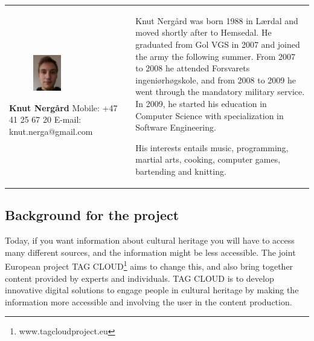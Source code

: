 \documentclass[11pt]{book}
\begin{document}
\begin{table}[H]
\centering
\begin{tabular}{ p{7cm} p{7cm} }
\parbox{7cm}{
\begin{figure}[H]
      \includegraphics[width=0.4\textwidth]{Figures/knut.jpg}
      \label{fig:partners_group_knut}
\end{figure}
\textbf{Knut Nergård}\\
Mobile: +47 41 25 67 20\\
E-mail: knut.nerga@gmail.com} & \parbox{7cm}{
Knut Nergård was born 1988 in Lærdal and moved shortly after to Hemsedal. He graduated from Gol VGS in 2007 and joined the army the following summer. From 2007 to 2008 he attended Forsvarets ingeniørhøgskole, and from 2008 to 2009 he went through the mandatory military service. In 2009, he started his education in Computer Science with specialization in Software Engineering. 

His interests entails music, programming, martial arts, cooking, computer games, bartending and knitting.
}
\end{tabular}
\label{tab:partners_group_knut}
\end{table}


\subsection{Background for the project}
Today, if you want information about cultural heritage you will have to access many different sources, and the information might be less accessible. The joint European project TAG CLOUD\footnote{www.tagcloudproject.eu} aims to change this, and also bring together content provided by experts and individuals. TAG CLOUD is to develop innovative digital solutions to engage people in cultural heritage by making the information more accessible and involving the user in the content production.
\end{document}
